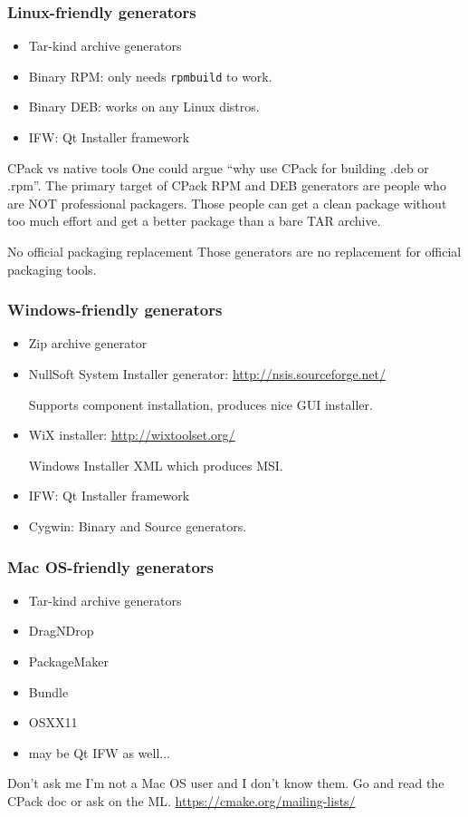 \documentclass[compress,slidestop,table
              ]
               {beamer}
\newcommand{\fname}[1]{\texttt{#1}}
\begin{document}
\begin{frame}[allowframebreaks]
\frametitle{Linux-friendly generators}
\begin{itemize}
\item Tar-kind archive generators
\item Binary RPM: only needs \fname{rpmbuild} to work.
\item Binary DEB: works on any Linux distros.
\item IFW: Qt Installer framework
\end{itemize}
\begin{block}{CPack vs native tools}
One could argue ``why use CPack for building .deb or .rpm''.
The primary target of CPack RPM and DEB generators are people who are NOT
professional packagers.
Those people can get a clean package without too much effort and get
a better package than a bare TAR archive.
\end{block}
\begin{alertblock}{No official packaging replacement}
Those generators are \alert{no replacement} for official packaging tools.
\end{alertblock}
\end{frame}

\begin{frame}
\frametitle{Windows-friendly generators}
\begin{itemize}
\item Zip archive generator
\item NullSoft System Installer generator: \url{http://nsis.sourceforge.net/}

      Supports component installation, produces nice GUI installer.
\item WiX installer: \url{http://wixtoolset.org/}

  Windows Installer XML which produces MSI.
\item IFW: Qt Installer framework
\item Cygwin: Binary and Source generators.
\end{itemize}
\end{frame}

\begin{frame}
\frametitle{Mac OS-friendly generators}
\begin{multicols}{2}
\begin{itemize}
\item Tar-kind archive generators
\item DragNDrop
\item PackageMaker
\item Bundle
\item OSXX11
\item may be Qt IFW as well...
\end{itemize}
\end{multicols}
\begin{alertblock}{Don't ask me}
I'm not a Mac OS user and I don't know them.
Go and read the CPack doc or ask on the ML.
\url{https://cmake.org/mailing-lists/}
\end{alertblock}
\end{frame}
\end{document}
